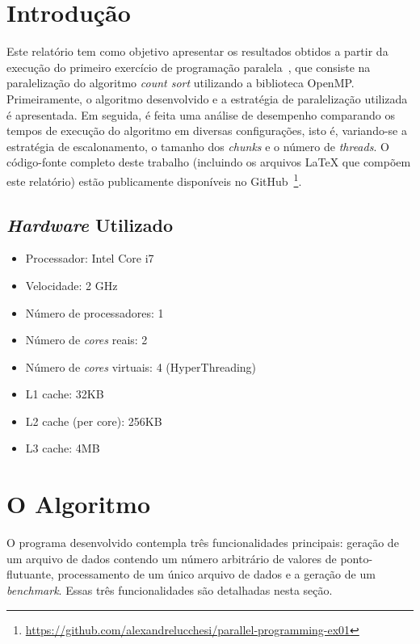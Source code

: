 \documentclass[12pt,a4paper]{article}
\begin{document}


\section{Introdução}
Este relatório tem como objetivo apresentar os resultados obtidos a partir da
execução do primeiro exercício de programação paralela~\cite{exercise}, que
consiste na paralelização do algoritmo \emph{count sort} utilizando a
biblioteca OpenMP\@.  Primeiramente, o algoritmo desenvolvido e a estratégia de
paralelização utilizada é apresentada. Em seguida, é feita uma análise de
desempenho comparando os tempos de execução do algoritmo em diversas
configurações, isto é, variando-se a estratégia de escalonamento, o tamanho dos
\textit{chunks} e o número de \textit{threads}. O código-fonte completo deste
trabalho (incluindo os arquivos \LaTeX\xspace que compõem este relatório) estão
publicamente disponíveis no
GitHub~\footnote{\url{https://github.com/alexandrelucchesi/parallel-programming-ex01}}.

\subsection{\textit{Hardware} Utilizado}
\label{sec:hardware}

\begin{itemize}
    \item Processador: Intel Core i7
    \item Velocidade: 2 GHz
    \item Número de processadores: 1
    \item Número de \textit{cores} reais: 2
    \item Número de \textit{cores} virtuais: 4 (HyperThreading)
    \item L1 cache: 32KB
    \item L2 cache (per core): 256KB
    \item L3 cache: 4MB
\end{itemize}


\section{O Algoritmo}
O programa desenvolvido contempla três funcionalidades principais: geração de um
arquivo de dados contendo um número arbitrário de valores de ponto-flutuante,
processamento de um único arquivo de dados e a geração de um \textit{benchmark}.
Essas três funcionalidades são detalhadas nesta seção.
\end{document}
